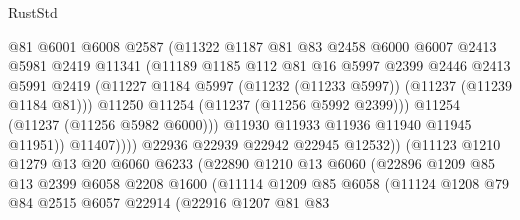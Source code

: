 \begin{lexlean}{RustStd}
\begin{coremodule}
                            @81
                            @6001
                            @6008
                            @2587
                            (@11322
                              @1187
                              @81
                              @83
                              @2458
                              @6000
                              @6007
                              @2413
                              @5981
                              @2419
                              @11341
                              (@11189
                                @1185
                                @112
                                @81
                                @16
                                @5997
                                @2399
                                @2446
                                @2413
                                @5991
                                @2419
                                (@11227
                                  @1184
                                  @5997
                                  (@11232 (@11233 @5997))
                                  (@11237 (@11239 @1184 @81)))
                                @11250
                                @11254
                                (@11237 (@11256 @5992 @2399)))
                              @11254
                              (@11237 (@11256 @5982 @6000)))
                            @11930
                            @11933
                            @11936
                            @11940
                            @11945
                            @11951))
                        @11407))))
                @22936
                @22939
                @22942
                @22945
                @12532))
            (@11123
              @1210
              @1279
              @13
              @20
              @6060
              @6233
              (@22890
                @1210
                @13
                @6060
                (@22896
                  @1209
                  @85
                  @13
                  @2399
                  @6058
                  @2208
                  @1600
                  (@11114
                    @1209
                    @85
                    @6058
                    (@11124
                      @1208
                      @79
                      @84
                      @2515
                      @6057
                      @22914
                      (@22916
                        @1207
                        @81
                        @83

\end{coremodule}
\end{lexlean}
